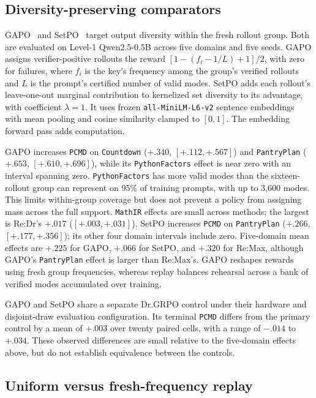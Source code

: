 \documentclass{article}
\newcommand{\1}{\mathbf 1}
\newcommand{\pmd}{\texttt{PCMD}}
\theoremstyle{remark}
\theoremstyle{definition}
\theoremstyle{plain}
\begin{document}
\subsection{Diversity-preserving comparators}
\label{app:diversity-comparators}

GAPO~\citep{anschel2025groupaware} and SetPO~\citep{li2026setpo} target
output diversity within the fresh rollout group. Both are evaluated on
Level-1 Qwen2.5-0.5B across five domains and five seeds. GAPO assigns
verifier-positive rollouts the reward $[1-(f_i-1/L)+1]/2$, with zero for
failures, where $f_i$ is the key's frequency among the group's verified
rollouts and $L$ is the prompt's certified number of valid modes.
SetPO adds each rollout's leave-one-out marginal contribution to kernelized
set diversity to its advantage, with coefficient $\lambda=1$.
It uses frozen \texttt{all-MiniLM-L6-v2} sentence embeddings with mean pooling
and cosine similarity clamped to $[0,1]$. The embedding forward pass adds
computation.

GAPO increases \pmd{} on \texttt{Countdown} ($+.340$, $[+.112,+.567]$) and \texttt{PantryPlan}
($+.653$, $[+.610,+.696]$), while its \texttt{PythonFactors} effect is near zero
with an interval spanning zero. \texttt{PythonFactors} has more valid modes than the
sixteen-rollout group can represent on 95\% of training prompts, with up to 3,600
modes. This limits within-group coverage but does not prevent a policy from
assigning mass across the full support. \texttt{MathIR} effects are small across
methods; the largest is Re:Dr's $+.017$ ($[+.003,+.031]$).
SetPO increases \pmd{} on \texttt{PantryPlan} ($+.266$, $[+.177,+.356]$); its other
four domain intervals include zero. Five-domain mean effects are $+.225$
for GAPO, $+.066$ for SetPO, and $+.320$ for Re:Max, although GAPO's
\texttt{PantryPlan} effect is larger than Re:Max's. GAPO reshapes rewards using fresh
group frequencies, whereas replay balances rehearsal across a bank of
verified modes accumulated over training.

GAPO and SetPO share a separate Dr.GRPO control under their hardware and
disjoint-draw evaluation configuration. Its terminal \pmd{} differs from
the primary control by a mean of $+.003$ over twenty paired cells, with a
range of $-.014$ to $+.034$. These observed differences are small relative
to the five-domain effects above, but do not establish equivalence between
the controls.

\subsection{Uniform versus fresh-frequency replay}
\label{app:frequency-replay-progress}
\end{document}
